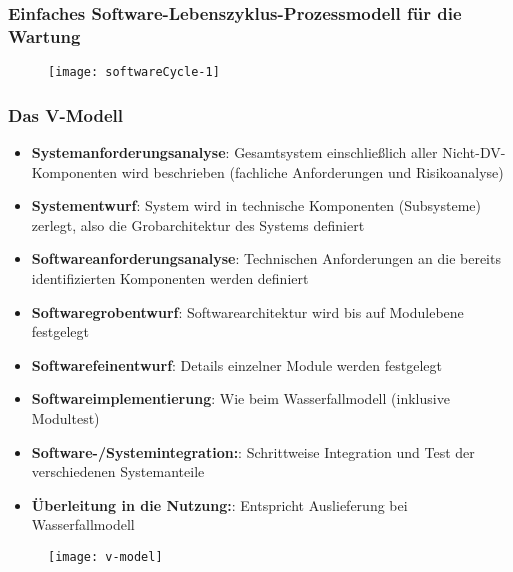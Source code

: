 	\subsubsection{Einfaches Software-Lebenszyklus-Prozessmodell für die Wartung}
	\begin{figure}[h]
		\centering
		\texttt{[image: softwareCycle-1]}
	\end{figure}
	\subsubsection{Das V-Modell}
	\begin{itemize}
		\item \textbf{Systemanforderungsanalyse}: Gesamtsystem einschließlich aller Nicht-DV-Komponenten wird beschrieben (fachliche Anforderungen und Risikoanalyse)
		\item \textbf{Systementwurf}: System wird in technische Komponenten (Subsysteme) zerlegt, also die Grobarchitektur des Systems definiert
		\item \textbf{Softwareanforderungsanalyse}: Technischen Anforderungen an die bereits identifizierten Komponenten werden definiert
		\item \textbf{Softwaregrobentwurf}: Softwarearchitektur wird bis auf Modulebene festgelegt
		\item \textbf{Softwarefeinentwurf}: Details einzelner Module werden festgelegt
		\item \textbf{Softwareimplementierung}: Wie beim Wasserfallmodell (inklusive Modultest) 
		\item \textbf{Software-/Systemintegration:}: Schrittweise Integration und Test der verschiedenen Systemanteile
		\item \textbf{Überleitung in die Nutzung:}: Entspricht Auslieferung bei Wasserfallmodell
	\end{itemize}
	\begin{figure}[h]
		\centering
		\texttt{[image: v-model]}
	\end{figure}
